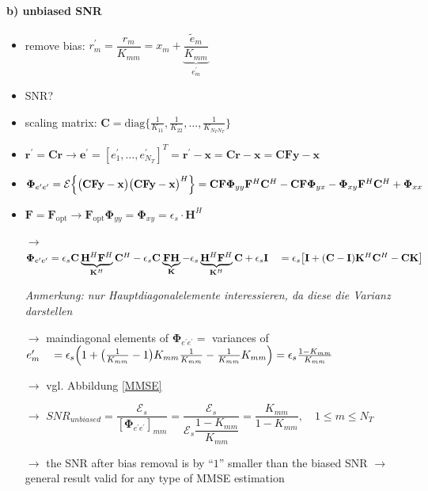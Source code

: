 \documentclass[a4paper, 10pt]{article}
\begin{document}
\paragraph{b) unbiased SNR}
\label{par:unbiased_SNR}
\begin{itemize}
	\item remove bias: $r_m^\prime = \dfrac{r_m}{K_{mm}} = x_m + \underbrace{\dfrac{\tilde{e}_m}{K_{mm}}}_{e^\prime_m} $
	\item SNR?
	\item scaling matrix: $ \mathbf{C} = \text{diag}\bigl\{\frac{1}{K_{11}}, \frac{1}{K_{22}}, \dots, \frac{1}{K_{N_TN_T}}  \bigr\} $
	\item $\mathbf{r}^\prime = \mathbf{Cr} \rightarrow \mathbf{e}^\prime = [e^\prime_1, \dots, e^\prime_{N_T}]^T = \mathbf{r}^\prime - \mathbf{x}  = \mathbf{Cr} - \mathbf{x} = \mathbf{CFy} - \mathbf{x} $
	\item $\boldsymbol{\Phi}_{e^\prime e^\prime} = \mathcal{E}\Bigl\{\bigr(\mathbf{CFy} - \mathbf{x}\bigr)\bigl(\mathbf{CFy} - \mathbf{x}\bigr)^H\Bigr\} = \mathbf{CF}\boldsymbol{\Phi}_{yy}\mathbf{F}^H\mathbf{C}^H - \mathbf{CF}\boldsymbol{\Phi}_{yx} - \boldsymbol{\Phi}_{xy}\mathbf{F}^H\mathbf{C}^H + \boldsymbol{\Phi}_{xx}$
	\item $ \mathbf{F} = 	\mathbf{F}_{\text{opt}} \rightarrow \mathbf{F}_{\text{opt}}\boldsymbol{\Phi}_{yy} = \boldsymbol{\Phi}_{xy} = \epsilon_s\cdot\mathbf{H}^H $
	\item[$\rightarrow$] $\boldsymbol{\Phi}_{e^\prime e^\prime} = \epsilon_s\mathbf{C}\underbrace{\mathbf{H}^H\mathbf{F}^H}_{\mathbf{K}^H}\mathbf{C}^H - \epsilon_s\mathbf{C}\underbrace{\mathbf{FH}}_{\mathbf{K}} - \epsilon_s\underbrace{\mathbf{H}^H\mathbf{F}^H}_{\mathbf{K}^H}\mathbf{C}  + \epsilon_s\mathbf{I} \\ \quad = \epsilon_s\bigl[\mathbf{I} + (\mathbf{C} - \mathbf{I})\mathbf{K}^H\mathbf{C}^H - \mathbf{CK}\bigr]$  
	\item[] \textit{Anmerkung: nur Hauptdiagonalelemente interessieren, da diese die Varianz darstellen}
	\item[$\rightarrow$] maindiagonal elements of $\boldsymbol{\Phi}_{e^\prime e^\prime} =  $ variances of $ e^\prime _m \quad = \epsilon_s\Bigl ( 1 + \bigl (\frac{1}{K_{mm}} - 1\bigr )   K_{mm}\frac{1}{K_{mm}}  - \frac{1}{K_{mm}}  K_{mm}\Bigr )  = \epsilon_s\frac{1 - K_{mm}}{K_{mm}}$
	\item[$\rightarrow$] vgl. Abbildung \ref{MMSE}
	\item[$\rightarrow$]$SNR_{unbiased}=\dfrac{\mathcal{E}_s}{[\boldsymbol{\Phi}_{e^\prime e^\prime}]_{mm}}=\dfrac{\mathcal{E}_s}{\mathcal{E}_s\dfrac{1-K_{mm}}{K_{mm}}}
	=\dfrac{K_{mm}}{1-K_{mm}}, \quad 1\leq m \leq N_T$
	\item[$\rightarrow$]the SNR after bias removal is by ``$1$'' smaller than the biased SNR $\rightarrow$ general result valid for any type of
	MMSE estimation
\end{itemize}
\end{document}
